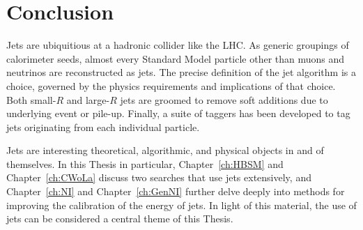 \section{Conclusion}
\label{sec:jets:conclusion}
Jets are ubiquitious at a hadronic collider like the LHC.
As generic groupings of calorimeter seeds, almost every Standard Model particle other than muons and neutrinos are reconstructed as jets.
The precise definition of the jet algorithm is a choice, governed by the physics requirements and implications of that choice.
Both small-$R$ and large-$R$ jets are groomed to remove soft additions due to underlying event or pile-up.
Finally, a suite of taggers has been developed to tag jets originating from each individual particle.

Jets are interesting theoretical, algorithmic, and physical objects in and of themselves.
In this Thesis in particular, Chapter~\ref{ch:HBSM} and Chapter~\ref{ch:CWoLa} discuss two searches that use jets extensively, and Chapter~\ref{ch:NI} and Chapter~\ref{ch:GenNI} further delve deeply into methods for improving the calibration of the energy of jets.
In light of this material, the use of jets can be considered a central theme of this Thesis.
